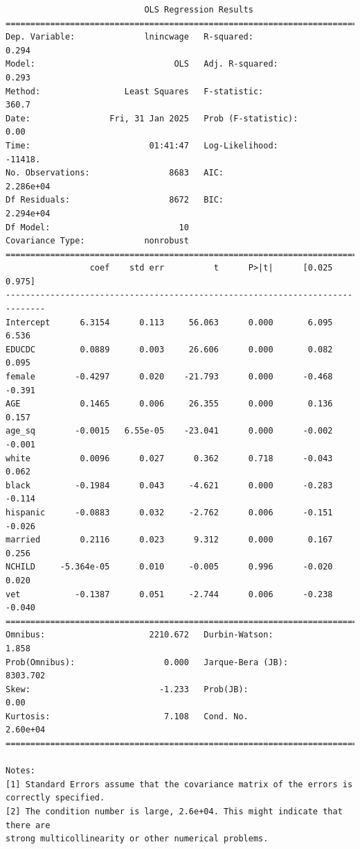 \documentclass[
  letterpaper,
  DIV=11,
  numbers=noendperiod]{scrartcl}
\begin{document}
\begin{verbatim}
                            OLS Regression Results                            
==============================================================================
Dep. Variable:              lnincwage   R-squared:                       0.294
Model:                            OLS   Adj. R-squared:                  0.293
Method:                 Least Squares   F-statistic:                     360.7
Date:                Fri, 31 Jan 2025   Prob (F-statistic):               0.00
Time:                        01:41:47   Log-Likelihood:                -11418.
No. Observations:                8683   AIC:                         2.286e+04
Df Residuals:                    8672   BIC:                         2.294e+04
Df Model:                          10                                         
Covariance Type:            nonrobust                                         
==============================================================================
                 coef    std err          t      P>|t|      [0.025      0.975]
------------------------------------------------------------------------------
Intercept      6.3154      0.113     56.063      0.000       6.095       6.536
EDUCDC         0.0889      0.003     26.606      0.000       0.082       0.095
female        -0.4297      0.020    -21.793      0.000      -0.468      -0.391
AGE            0.1465      0.006     26.355      0.000       0.136       0.157
age_sq        -0.0015   6.55e-05    -23.041      0.000      -0.002      -0.001
white          0.0096      0.027      0.362      0.718      -0.043       0.062
black         -0.1984      0.043     -4.621      0.000      -0.283      -0.114
hispanic      -0.0883      0.032     -2.762      0.006      -0.151      -0.026
married        0.2116      0.023      9.312      0.000       0.167       0.256
NCHILD     -5.364e-05      0.010     -0.005      0.996      -0.020       0.020
vet           -0.1387      0.051     -2.744      0.006      -0.238      -0.040
==============================================================================
Omnibus:                     2210.672   Durbin-Watson:                   1.858
Prob(Omnibus):                  0.000   Jarque-Bera (JB):             8303.702
Skew:                          -1.233   Prob(JB):                         0.00
Kurtosis:                       7.108   Cond. No.                     2.60e+04
==============================================================================

Notes:
[1] Standard Errors assume that the covariance matrix of the errors is correctly specified.
[2] The condition number is large, 2.6e+04. This might indicate that there are
strong multicollinearity or other numerical problems.
\end{verbatim}
\end{document}
